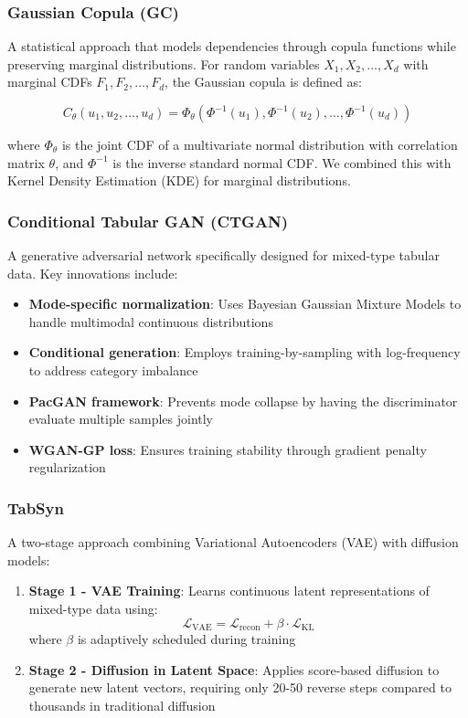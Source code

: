 \documentclass[conference]{IEEEtran}
\begin{document}
\subsubsection{Gaussian Copula (GC)}
A statistical approach that models dependencies through copula functions while preserving marginal distributions. For random variables $X_1, X_2, \ldots, X_d$ with marginal CDFs $F_1, F_2, \ldots, F_d$, the Gaussian copula is defined as:

\begin{equation}
C_\theta(u_1, u_2, \ldots, u_d) = \Phi_\theta(\Phi^{-1}(u_1), \Phi^{-1}(u_2), \ldots, \Phi^{-1}(u_d))
\end{equation}

where $\Phi_\theta$ is the joint CDF of a multivariate normal distribution with correlation matrix $\theta$, and $\Phi^{-1}$ is the inverse standard normal CDF. We combined this with Kernel Density Estimation (KDE) for marginal distributions.

\subsubsection{Conditional Tabular GAN (CTGAN)}
A generative adversarial network specifically designed for mixed-type tabular data. Key innovations include:
\begin{itemize}
    \item \textbf{Mode-specific normalization}: Uses Bayesian Gaussian Mixture Models to handle multimodal continuous distributions
    \item \textbf{Conditional generation}: Employs training-by-sampling with log-frequency to address category imbalance
    \item \textbf{PacGAN framework}: Prevents mode collapse by having the discriminator evaluate multiple samples jointly
    \item \textbf{WGAN-GP loss}: Ensures training stability through gradient penalty regularization
\end{itemize}

\subsubsection{TabSyn}
A two-stage approach combining Variational Autoencoders (VAE) with diffusion models:
\begin{enumerate}
    \item \textbf{Stage 1 - VAE Training}: Learns continuous latent representations of mixed-type data using:
    \begin{equation}
    \mathcal{L}_{\text{VAE}} = \mathcal{L}_{\text{recon}} + \beta \cdot \mathcal{L}_{\text{KL}}
    \end{equation}
    where $\beta$ is adaptively scheduled during training
    \item \textbf{Stage 2 - Diffusion in Latent Space}: Applies score-based diffusion to generate new latent vectors, requiring only 20-50 reverse steps compared to thousands in traditional diffusion
\end{enumerate}
\end{document}
